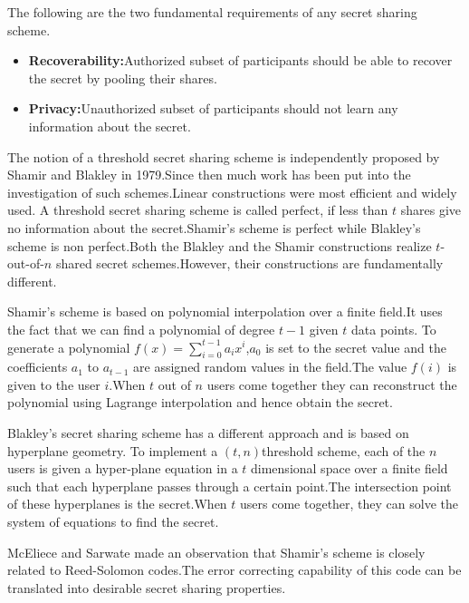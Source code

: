 \documentclass{llncs}
\begin{document}
The following are the two fundamental requirements of any secret sharing scheme.

\begin{itemize}
\item \textbf{Recoverability:}Authorized subset of participants should be able to recover the secret by pooling their shares.
\item \textbf{Privacy:}Unauthorized subset of participants should not learn any information about the secret.
\end{itemize}

The notion of a threshold secret sharing scheme is independently proposed by Shamir \cite{shamir1979} and Blakley \cite{blakley1979} in 1979.Since then much work has been put into the investigation of such schemes.Linear constructions were most efficient and widely used.
A threshold secret sharing scheme is called perfect, if less than $t$ shares give no information about the secret.Shamir's scheme is perfect while Blakley's scheme is non perfect.Both the Blakley
and the Shamir constructions realize $t$-out-of-$n$ shared secret schemes.However, their constructions are fundamentally different.

Shamir's scheme is based on   polynomial interpolation over a finite field.It uses the fact that we can find a polynomial of degree $t-1$ given $t$ data points. To generate a polynomial $f(x)=\sum_{i=0}^{t-1}a_ix^i$,$a_0$ is set to the secret value and the coefficients $a_1$ to $a_{t-1}$ are assigned random values in the field.The value $f(i)$ is given to the user $i$.When $t$ out of $n$ users come together they can reconstruct the polynomial using Lagrange interpolation and hence obtain the secret.

Blakley's secret sharing scheme has a different approach and is
based on hyperplane geometry. To implement a $(t,n)$threshold scheme, each of the $n$ users is given a hyper-plane equation in a
$t$ dimensional space over a finite field such that each hyperplane passes through a certain point.The intersection point of these hyperplanes is the secret.When $t$ users come together, they can solve the system of equations to find the secret.

 McEliece and Sarwate \cite{mceliece1981sharing} made an observation that Shamir's scheme is closely related to Reed-Solomon codes\cite{reed1960polynomial}.The error correcting capability of this code can be translated into desirable secret sharing properties.
\end{document}
